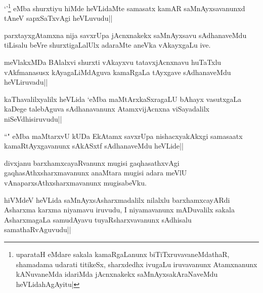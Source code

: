 \begin{artha}
`\stext '\footnote[1]{uparataH eMdare sakala kamaRgaLanunx biTiTxruvavaneMdathaR, shamadama udarati titikeSx, sharxdedhx ivugaLu iruvavanunx Atamxnanunx kANuvaneMda idariMda jAcnxnakekx saMnAyxsakAraNaveMdu heVLidahAgAyitu|} eMba shurxtiyu hiMde heVLidaMte samasatx kamAR saMnAyxsavanunxd tAneV sapxSaTxvAgi heVLuvudu||
\end{artha}

\begin{artha}
parxtayxgAtamxna nija savxrUpa jAcnxnakekx saMnAyxsavu sAdhanaveMdu tiLisalu beVre shurxtigaLalUlx adaraMte aneVka vAkayxgaLu ive. 
\end{artha}


\begin{artha}%
meVlakxMDa BAlalxvi shurxti vAkayxvu tatavxjAcnxnavu huTaTxlu vAkfmanasusx kAyagaLiMdAguva kamaRgaLa tAyxgave sAdhanaveMdu heVLiruvadu||
\end{artha}


\begin{artha}
kaThavalilxyalilx heVLida `\stext eMba maMtArxkaSxragaLU bAhayx vasutxgaLa kaDege talebAguva sAdhanavanunx AtamxvijAcnxna viSayadalilx niSeVdhisiruvudu||
\end{artha}


\begin{artha}
``\stext " eMba maMtarxvU kUDa EkAtamx savxrUpa nishacxyakAkxgi samasaatx kamaRtAyxgavanunx sAkASxtf sAdhanaveMdu heVLide||
\end{artha}


\begin{artha}
divxjanu barxhamxcayaRvanunx mugisi gaqhasathxvAgi gaqhasAthxsharxmavanunx anaMtara mugisi adara meVlU vAnaparxsAthxsharxmavanunx mugisabeVku.
\end{artha}


\begin{artha}
hiVMdeV heVLida saMnAyxsAsharxmadalilx nilalxlu barxhamxcayARdi Asharxma  karxma niyamavu iruvudu, I niyamavanunx mADuvalilx sakala AsharxmagaLa samudAyavu tuyaRsharxvavanunx sAdhisalu samathaRvAguvudu||
\end{artha}

